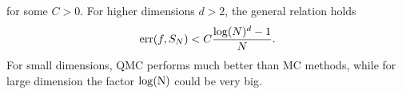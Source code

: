for some $C>0$.
For higher dimensions $d>2$, the general relation holds
\begin{equation}
\textrm{err}(f, S_{N})<C \frac{\log(N)^d-1}{N}.
\end{equation}
For small dimensions, QMC performs much better than MC methods, while for large dimension the factor $\log(\textrm{N})$ could be very big. 
